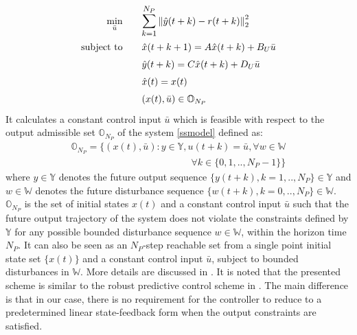 \documentclass[letterpaper, 10 pt, conference]{ieeeconf}  %
\newcommand{\norm}[1]{\left\lVert#1\right\rVert}
\newcommand{\AB}[1]{\textbf{\color{magenta}{[AB: #1]}}}
\begin{document}
  	\begin{equation}
  	\small
  	\begin{aligned}
  	\underset{\bar{u}}{\text{min}}
  	&  \hspace{20pt} \mathlarger{\sum\limits_{k=1}^{N_P}}\norm{\hat y(t+k)-r(t+k)}_2^2 \\
  	\text{subject to}
  	& \hspace{20pt} \hat{x}(t+k+1) = A\hat{x}(t+k) + B_U\bar{u}\\
  	& \hspace{20pt} \hat y(t+k) = C\hat{x}(t+k) + D_U\bar{u} \\
  	& \hspace{20pt} \hat{x}(t)=x(t) \\
  	& \hspace{20pt} (x(t),\bar{u}) \in \mathbb{O}_{N_P}
  	\end{aligned}
  	\label{RMPC}
  	\end{equation}
  It calculates a constant control input $\bar{u}$ which is feasible with respect to the output admissible set $\mathbb{O}_{N_P}$ of the system \eqref{ssmodel} defined as:
  \begin{equation}
  \begin{matrix}
  \mathbb{O}_{N_P} = \{(x(t),\bar{u}):y\in \mathbb{Y}, u(t+k)=\bar{u},\forall w \in \mathbb{W}  \\ \hspace{150pt} \forall k \in \{0,1,..,N_P-1\} \}
  \end{matrix}
  \label{O_form}
  \end{equation}
  where $y \in \mathbb{Y}$ denotes the future output sequence $\{y(t+k),k=1,..,N_P\}\in\mathbb{Y}$
  and $w \in \mathbb{W}$ denotes the future disturbance sequence $\{w(t+k),k=0,..,N_P\}\in\mathbb{W}$.
  $\mathbb{O}_{N_P}$ is the set of initial states $x(t)$ and a constant control input $\bar{u}$ such that the future output trajectory of the system does not violate the constraints defined by $\mathbb{Y}$ for any possible bounded disturbance sequence $w\in\mathbb{W}$, within the horizon time $N_P$. It can also be seen as an $N_P$-step reachable set from a single point initial state set $\{x(t)\}$ and a constant control input $\bar{u}$, subject to bounded disturbances in $\mathbb{W}$. More details are discussed in \cite{Predictivecontrol}. It is noted that the presented scheme is similar to the robust predictive control scheme in \cite{CHISCI20011019}. The main difference is that in our case, there is no requirement for the controller to reduce to a predetermined linear state-feedback form when the output constraints are satisfied.
\end{document}
